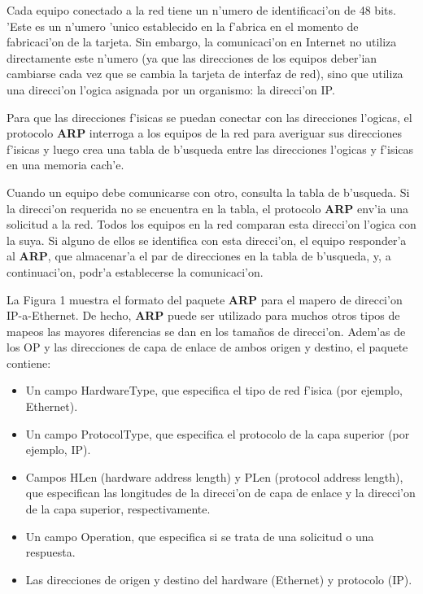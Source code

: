 \documentclass[a4paper,10pt]{article}
\begin{document}
\vspace*{5 mm}
Cada equipo conectado a la red tiene un n'umero de identificaci'on de 48 bits. 'Este es un n'umero 'unico establecido en la f'abrica en el momento de fabricaci'on de la tarjeta. Sin embargo, la comunicaci'on en Internet no utiliza directamente este n'umero (ya que las direcciones de los equipos deber'ian cambiarse cada vez que se cambia la tarjeta de interfaz de red), sino que utiliza una direcci'on l'ogica asignada por un organismo: la direcci'on IP.

\vspace*{5 mm}
Para que las direcciones f'isicas se puedan conectar con las direcciones l'ogicas, el protocolo \textbf{ARP} interroga a los equipos de la red para averiguar sus direcciones f'isicas y luego crea una tabla de b'usqueda entre las direcciones l'ogicas y f'isicas en una memoria cach'e.

\vspace*{5 mm}
Cuando un equipo debe comunicarse con otro, consulta la tabla de b'usqueda. Si la direcci'on requerida no se encuentra en la tabla, el protocolo \textbf{ARP} env'ia una solicitud a la red. Todos los equipos en la red comparan esta direcci'on l'ogica con la suya. Si alguno de ellos se identifica con esta direcci'on, el equipo responder'a al \textbf{ARP}, que almacenar'a el par de direcciones en la tabla de b'usqueda, y, a continuaci'on, podr'a establecerse la comunicaci'on. 

\vspace*{5 mm}
La Figura 1 muestra el formato del paquete \textbf{ARP} para el mapero de direcci'on IP-a-Ethernet. De hecho, \textbf{ARP} puede ser utilizado para muchos otros tipos de mapeos las mayores diferencias se dan en los tama\~nos de direcci'on. Adem'as de los OP y las direcciones de capa de enlace de ambos origen y destino, el paquete contiene:

\begin{itemize}
	\item Un campo HardwareType, que especifica el tipo de red f'isica (por ejemplo, Ethernet).
	\item Un campo ProtocolType, que especifica el protocolo de la capa superior (por ejemplo, IP).
	\item Campos HLen (hardware address length) y PLen (protocol address length), que especifican las longitudes de la direcci'on de capa de enlace y la direcci'on de la capa superior, respectivamente.
	\item Un campo Operation, que especifica si se trata de una solicitud o una respuesta.
	\item Las direcciones de origen y destino del hardware (Ethernet) y protocolo (IP).
\end{itemize}
\end{document}
